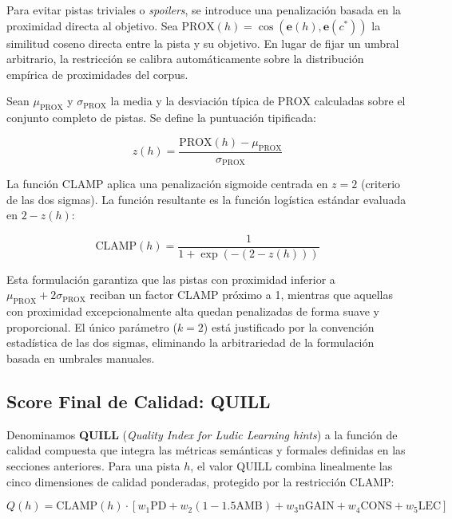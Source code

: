 \documentclass[../main.tex]{subfiles}
\begin{document}
Para evitar pistas triviales o \textit{spoilers}, se introduce una penalización basada en la proximidad directa al objetivo. Sea $\text{PROX}(h) = \cos(\mathbf{e}(h), \mathbf{e}(c^*))$ la similitud coseno directa entre la pista y su objetivo. En lugar de fijar un umbral arbitrario, la restricción se calibra automáticamente sobre la distribución empírica de proximidades del corpus.

Sean $\mu_{\text{PROX}}$ y $\sigma_{\text{PROX}}$ la media y la desviación típica de $\text{PROX}$ calculadas sobre el conjunto completo de pistas. Se define la puntuación tipificada:

\begin{equation}
    z(h) = \frac{\text{PROX}(h) - \mu_{\text{PROX}}}{\sigma_{\text{PROX}}}
\end{equation}

La función CLAMP aplica una penalización sigmoide centrada en $z = 2$ (criterio de las dos sigmas). La función resultante es la función logística estándar evaluada en $2 - z(h)$:

\begin{equation}
    \text{CLAMP}(h) = \frac{1}{1 + \exp\!\left(-(2 - z(h))\right)}
\end{equation}

Esta formulación garantiza que las pistas con proximidad inferior a $\mu_{\text{PROX}} + 2\sigma_{\text{PROX}}$ reciban un factor CLAMP próximo a 1, mientras que aquellas con proximidad excepcionalmente alta quedan penalizadas de forma suave y proporcional. El único parámetro ($k=2$) está justificado por la convención estadística de las dos sigmas, eliminando la arbitrariedad de la formulación basada en umbrales manuales.

\subsection{Score Final de Calidad: QUILL}

Denominamos \textbf{QUILL} (\textit{Quality Index for Ludic Learning hints}) a la función de calidad compuesta que integra las métricas semánticas y formales definidas en las secciones anteriores. Para una pista $h$, el valor QUILL combina linealmente las cinco dimensiones de calidad ponderadas, protegido por la restricción CLAMP:

\begin{equation}
    Q(h) = \text{CLAMP}(h) \cdot \left[ w_1 \text{PD} + w_2 (1 - 1.5 \text{AMB}) + w_3 \text{nGAIN} + w_4 \text{CONS} + w_5 \text{LEC} \right]
\end{equation}
\end{document}
